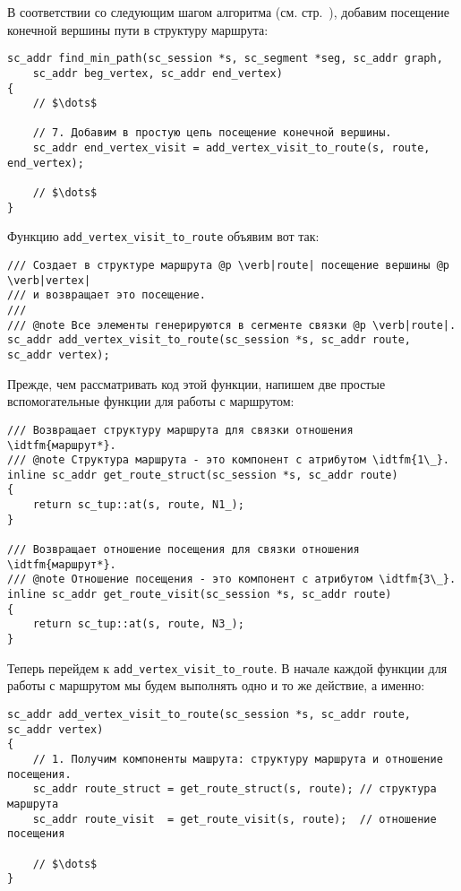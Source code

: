 В соответствии со следующим шагом алгоритма
(см. стр.~\pageref{S9_Add_end_vertex_visit_to_route_tuple}), добавим
посещение конечной вершины пути в структуру маршрута:
\begin{lstlisting}[texcl]
sc_addr find_min_path(sc_session *s, sc_segment *seg, sc_addr graph,
    sc_addr beg_vertex, sc_addr end_vertex)
{
    // $\dots$

    // 7. Добавим в простую цепь посещение конечной вершины.
    sc_addr end_vertex_visit = add_vertex_visit_to_route(s, route, end_vertex);

    // $\dots$
}
\end{lstlisting}

Функцию \lstinline|add_vertex_visit_to_route| объявим вот так:
\begin{lstlisting}[texcl]
/// Создает в структуре маршрута @p \verb|route| посещение вершины @p \verb|vertex|
/// и возвращает это посещение.
///
/// @note Все элементы генерируются в сегменте связки @p \verb|route|.
sc_addr add_vertex_visit_to_route(sc_session *s, sc_addr route, sc_addr vertex);
\end{lstlisting}

Прежде, чем рассматривать код этой функции, напишем две простые
вспомогательные функции для работы с маршрутом:

\begin{lstlisting}[texcl]
/// Возвращает структуру маршрута для связки отношения \idtfm{маршрут*}.
/// @note Структура маршрута - это компонент с атрибутом \idtfm{1\_}.
inline sc_addr get_route_struct(sc_session *s, sc_addr route)
{
    return sc_tup::at(s, route, N1_);
}

/// Возвращает отношение посещения для связки отношения \idtfm{маршрут*}.
/// @note Отношение посещения - это компонент с атрибутом \idtfm{3\_}.
inline sc_addr get_route_visit(sc_session *s, sc_addr route)
{
    return sc_tup::at(s, route, N3_);
}
\end{lstlisting}

Теперь перейдем к \lstinline|add_vertex_visit_to_route|. В начале
каждой функции для работы с маршрутом мы будем выполнять одно и то же
действие, а именно:

\begin{lstlisting}[texcl]
sc_addr add_vertex_visit_to_route(sc_session *s, sc_addr route, sc_addr vertex)
{
    // 1. Получим компоненты машрута: структуру маршрута и отношение посещения.
    sc_addr route_struct = get_route_struct(s, route); // структура маршрута
    sc_addr route_visit  = get_route_visit(s, route);  // отношение посещения

    // $\dots$
}
\end{lstlisting}

